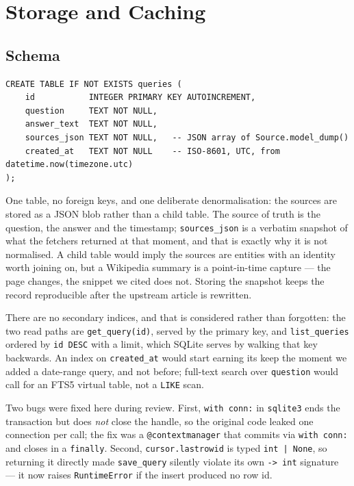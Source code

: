 \documentclass[11pt,a4paper]{article}
\begin{document}
\section{Storage and Caching}\label{sec:storage}

\subsection{Schema}

\begin{lstlisting}[style=plain]
CREATE TABLE IF NOT EXISTS queries (
    id           INTEGER PRIMARY KEY AUTOINCREMENT,
    question     TEXT NOT NULL,
    answer_text  TEXT NOT NULL,
    sources_json TEXT NOT NULL,   -- JSON array of Source.model_dump()
    created_at   TEXT NOT NULL    -- ISO-8601, UTC, from datetime.now(timezone.utc)
);
\end{lstlisting}

One table, no foreign keys, and one deliberate denormalisation: the sources are stored as a JSON
blob rather than a child table. The source of truth is the question, the answer and the
timestamp; \texttt{sources\_json} is a verbatim snapshot of what the fetchers returned at that
moment, and that is exactly why it is not normalised. A child table would imply the sources are
entities with an identity worth joining on, but a Wikipedia summary is a point-in-time capture
--- the page changes, the snippet we cited does not. Storing the snapshot keeps the record
reproducible after the upstream article is rewritten.

There are no secondary indices, and that is considered rather than forgotten: the two read paths
are \texttt{get\_query(id)}, served by the primary key, and \texttt{list\_queries} ordered by
\texttt{id DESC} with a limit, which SQLite serves by walking that key backwards. An index on
\texttt{created\_at} would start earning its keep the moment we added a date-range query, and not
before; full-text search over \texttt{question} would call for an FTS5 virtual table, not a
\texttt{LIKE} scan.

Two bugs were fixed here during review. First, \texttt{with conn:} in \texttt{sqlite3} ends the
transaction but does \emph{not} close the handle, so the original code leaked one connection per
call; the fix was a \texttt{@contextmanager} that commits via \texttt{with conn:} and closes in a
\texttt{finally}. Second, \texttt{cursor.lastrowid} is typed \texttt{int | None}, so returning it
directly made \texttt{save\_query} silently violate its own \texttt{-> int} signature --- it now
raises \texttt{RuntimeError} if the insert produced no row id.
\end{document}
